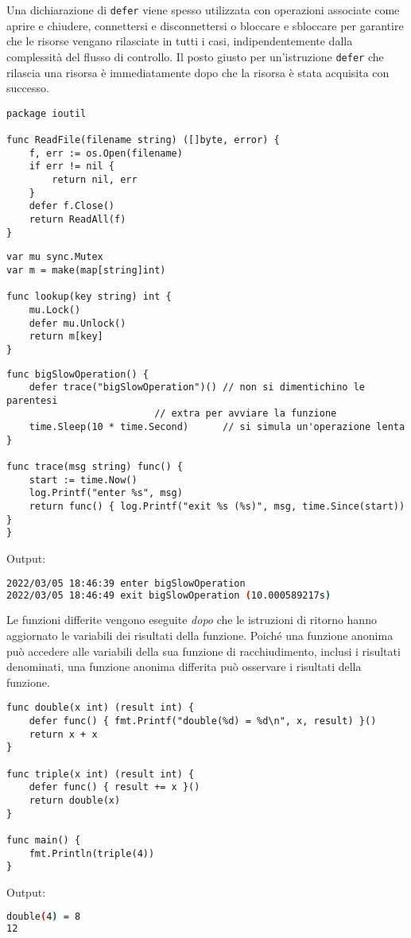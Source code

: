 \documentclass[../../thesis.tex]{subfiles}
\begin{document}
    Una dichiarazione di \verb"defer" viene spesso utilizzata con operazioni associate come aprire e chiudere, connettersi e disconnettersi o bloccare e sbloccare per garantire che le risorse vengano rilasciate in tutti i casi, indipendentemente dalla complessità del flusso di controllo.
    Il posto giusto per un'istruzione \verb"defer" che rilascia una risorsa è immediatamente dopo che la risorsa è stata acquisita con successo.
    \begin{lstlisting}[frame = single,label={lst:lstlisting4-8.1}]
package ioutil

func ReadFile(filename string) ([]byte, error) {
    f, err := os.Open(filename)
    if err != nil {
        return nil, err
    }
    defer f.Close()
    return ReadAll(f)
}
    \end{lstlisting}
    \begin{lstlisting}[frame = single,label={lst:lstlisting4-8.2}]
var mu sync.Mutex
var m = make(map[string]int)

func lookup(key string) int {
    mu.Lock()
    defer mu.Unlock()
    return m[key]
}
    \end{lstlisting}
    \begin{lstlisting}[frame = single,label={lst:lstlisting4-8.3}]
func bigSlowOperation() {
    defer trace("bigSlowOperation")() // non si dimentichino le parentesi
    				      // extra per avviare la funzione
    time.Sleep(10 * time.Second)      // si simula un'operazione lenta
}

func trace(msg string) func() {
    start := time.Now()
    log.Printf("enter %s", msg)
    return func() { log.Printf("exit %s (%s)", msg, time.Since(start)) }
}
    \end{lstlisting}
    Output:
    \begin{lstlisting}[language = bash, frame = L,label={lst:lstlisting4-8.4}]
2022/03/05 18:46:39 enter bigSlowOperation
2022/03/05 18:46:49 exit bigSlowOperation (10.000589217s)
    \end{lstlisting}
    Le funzioni differite vengono eseguite \textit{dopo} che le istruzioni di ritorno hanno aggiornato le variabili dei risultati della funzione.
    Poiché una funzione anonima può accedere alle variabili della sua funzione di racchiudimento, inclusi i risultati denominati, una funzione anonima differita può osservare i risultati della funzione.
    \begin{lstlisting}[frame = single,label={lst:lstlisting4-8.5}]
func double(x int) (result int) {
    defer func() { fmt.Printf("double(%d) = %d\n", x, result) }()
    return x + x
}

func triple(x int) (result int) {
    defer func() { result += x }()
    return double(x)
}

func main() {
    fmt.Println(triple(4))
}
    \end{lstlisting}
    Output:
    \begin{lstlisting}[language = bash, frame = L,label={lst:lstlisting4-8.6}]
double(4) = 8
12
    \end{lstlisting}
\end{document}
